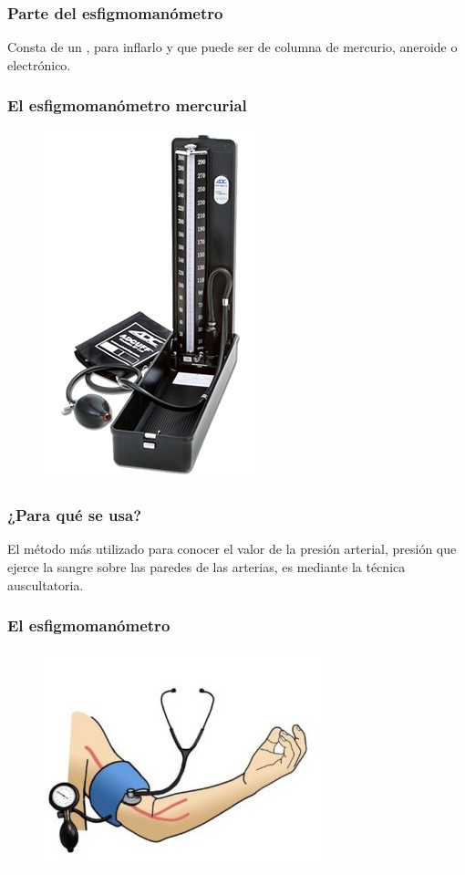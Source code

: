 \documentclass[14pt]{beamer}
\begin{document}
\begin{frame}
\frametitle{Parte del esfigmomanómetro}
Consta de un , \pause {} para inflarlo y \pause {} que puede ser de columna de mercurio, aneroide o electrónico.
\end{frame}
\begin{frame}
\frametitle{El esfigmomanómetro mercurial}
\vspace*{-1cm}
\begin{figure}
    \centering
    \includegraphics[scale=0.45]{Imagenes/Esfigmomanometro_01.jpg}
\end{figure}
\end{frame}
\begin{frame}
\frametitle{¿Para qué se usa?}
El método más utilizado para conocer el valor de la presión arterial, presión que ejerce la sangre sobre las paredes de las arterias, es mediante la técnica auscultatoria.
\end{frame}
\begin{frame}
\frametitle{El esfigmomanómetro}
\vspace*{-1cm}
\begin{figure}
    \centering
    \includegraphics[scale=2]{Imagenes/Esfigmomanometro_02.jpg}
\end{figure}
\end{frame}
\end{document}
